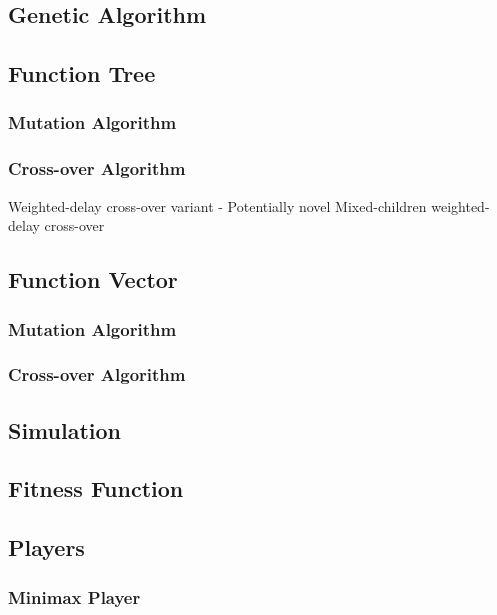 \documentclass{acm_proc_article-sp}
\begin{document}
    \subsection{Genetic Algorithm}

    \subsection{Function Tree}

        \subsubsection{Mutation Algorithm}
        \subsubsection{Cross-over Algorithm}

    Weighted-delay cross-over variant - Potentially novel
    Mixed-children weighted-delay cross-over

    \subsection{Function Vector}
    
        \subsubsection{Mutation Algorithm}
        \subsubsection{Cross-over Algorithm}

    \subsection{Simulation}

    \subsection{Fitness Function}

    \subsection{Players}

        \subsubsection{Minimax Player}
    
\end{document}
